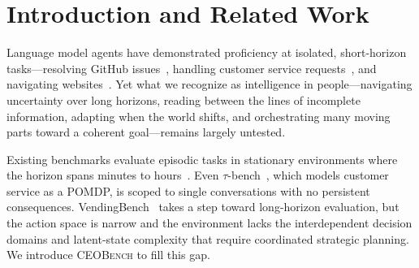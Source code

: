 \documentclass[10pt,letterpaper,twocolumn]{article}
\begin{document}



\section{Introduction and Related Work}

Language model agents have demonstrated proficiency at isolated, short-horizon tasks---resolving GitHub issues~\cite{jimenez2024swebench}, handling customer service requests~\cite{yao2024taubench}, and navigating websites~\cite{zhou2024webarena}. Yet what we recognize as intelligence in people---navigating uncertainty over long horizons, reading between the lines of incomplete information, adapting when the world shifts, and orchestrating many moving parts toward a coherent goal---remains largely untested.

Existing benchmarks evaluate episodic tasks in stationary environments where the horizon spans minutes to hours~\cite{jimenez2024swebench,zhou2024webarena,liu2023agentbench,mialon2024gaia}. Even $\tau$-bench~\cite{yao2024taubench}, which models customer service as a POMDP, is scoped to single conversations with no persistent consequences. VendingBench~\cite{backlund2025vendingbench} takes a step toward long-horizon evaluation, but the action space is narrow and the environment lacks the interdependent decision domains and latent-state complexity that require coordinated strategic planning. We introduce \textsc{CEOBench} to fill this gap.
\end{document}
